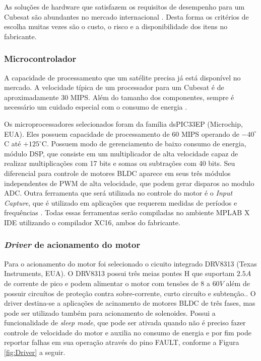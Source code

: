 \documentclass[
	12pt,				%
	openany,			%
	twoside,			%
	a4paper,			%
	english,			%
	french,				%
	spanish,			%
	brazil,				%
	oldfontcommands
	]{abntex2}
\begin{document}
As soluções de hardware que satisfazem os requisitos de desempenho para um Cubesat são abundantes no mercado internacional \cite{STATEOFART}. Desta forma os critérios de escolha muitas vezes são o custo, o risco e a disponibilidade dos itens no fabricante.


\subsubsection{Microcontrolador}

A capacidade de processamento que um satélite precisa já está disponível no mercado. A velocidade típica de um processador para um Cubesat é de aproximadamente 30 MIPS. Além do tamanho dos componentes, sempre é necessário um cuidado especial com o consumo de energia \cite{STATEOFART}.

Os microprocessadores selecionados foram da família dsPIC33EP (Microchip, EUA). Eles possuem capacidade de processamento de 60 MIPS operando de $-40^{\circ}$C até $+125^{\circ}$C. Possuem modo de gerenciamento de baixo consumo de energia, módulo DSP, que consiste em um multiplicador de alta velocidade capaz de realizar multiplicações com 17 bits e somas ou subtrações com 40 bits. Seu diferencial para controle de motores BLDC aparece em seus três módulos independentes de PWM de alta velocidade, que podem gerar disparos ao modulo ADC. Outra ferramenta que será utilizada no controle do motor é o \textit{Input Capture}, que é utilizado em aplicações que requerem medidas de períodos e frequências \cite{dsPIC33EP}. Todas essas ferramentas serão compiladas no ambiente MPLAB X IDE utilizando o compilador XC16, ambos do fabricante.

\subsubsection{\textit{Driver} de acionamento do motor}

Para o acionamento do motor foi selecionado o cicuito integrado DRV8313 (Texas Instruments, EUA). O DRV8313 possui três meias pontes H que suportam $2.5A$ de corrente de pico e podem alimentar o motor com tensões de $8$ a $60V$ além de possuir circuítos de proteção contra sobre-corrente, curto circuíto e subtenção.\cite{DRV8313}. O driver destina-se a aplicações de acinamento de motores BLDC de três fases, mas pode ser utilizado também para acionamento de solenoides. Possui a funcionalidade de \textit{sleep mode}, que pode ser ativada quando não é preciso fazer controle de velocidade do motor e auxilia no consumo de energia e por fim pode reportar falhas em sua operação através do pino FAULT, conforme a Figura \ref{fig:Driver} a seguir.
\end{document}
